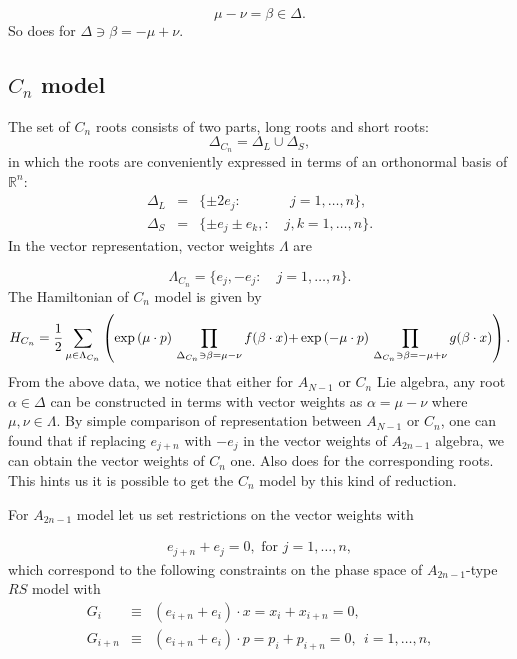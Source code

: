 \documentclass[a4paper,12pt]{article}
\begin{document}
\[
\mu -\nu =\beta \in \Delta .
\]
So does for $\Delta \ni \beta =-\mu +\nu .$

\subsection{$C_{n}$ model}

The set of $C_{n}$ roots consists of two parts, long roots and short roots:
\begin{equation}
\Delta _{C_{n}}=\Delta _{L}\cup \Delta _{S},  \label{cnroot}
\end{equation}
in which the roots are conveniently expressed in terms of an orthonormal
basis of ${\mathbb R}^{n}$:
\begin{eqnarray}
\Delta _{L} &=&\{\pm 2e_{j}:\quad \qquad \ \ j=1,\ldots ,n\},  \nonumber \\
\Delta _{S} &=&\{\pm e_{j}\pm e_{k},:\quad j,k=1,\ldots ,n\}.
\end{eqnarray}
In the vector representation, vector weights $\Lambda $ are

\begin{equation}
\Lambda _{C_{n}}=\{e_{j},-e_{j}:\quad j=1,\ldots ,n\}.
\end{equation}
The Hamiltonian of $C_{n}$ model is given by
\begin{equation}
H_{C_{n}}=\frac{1}{2}\sum_{\mu \in \Lambda _{C_{n}}}\left( \exp \left( \mu
\cdot p\right) \,\prod_{\Delta _{C_{n}}\ni \beta =\mu -\nu }f(\beta \cdot x){%
+}\exp \left( -\mu \cdot p\right) \,\prod_{\Delta _{C_{n}}\ni \beta =-\mu
+\nu }g(\beta \cdot x)\right) .	 \label{cnhami}
\end{equation}
From the above data, we notice that either for $A_{N-1}$ or $C_{n}$ Lie
algebra, any root $\alpha \in \Delta $ can be constructed in terms with
vector weights as $\alpha =\mu -\nu $ where $\mu ,\nu \in \Lambda .$ By
simple comparison of representation between $A_{N-1}$ or $C_{n}$, one can
found that if replacing $e_{j+n}$ with $-e_{j}$ in the vector weights of $%
A_{2n-1}$ algebra, we can obtain the vector weights of $C_{n}$ one. Also
does for the corresponding roots. This hints us it is possible to get the $%
C_{n}$ model by this kind of reduction.

\vspace{1pt}For $A_{2n-1}$ model let us set restrictions on the vector
weights with

\begin{eqnarray}
e_{j+n}+e_{j}=0,\mbox{\ \ \  for \ \ \ }j=1,\ldots ,n,
\end{eqnarray}
which correspond to the following constraints on the phase space of
$A_{2n-1}$-type $RS$ model with
\begin{eqnarray}
G_{i} &\equiv &(e_{i+n}+e_{i})\cdot x=x_{i}+x_{i+n}=0,	\nonumber \\
G_{i+n} &\equiv &(e_{i+n}+e_{i})\cdot p=p_{i}+p_{i+n}=0,\ \ i=1,\ldots
,n,
\label{cncon}
\end{eqnarray}
\end{document}

